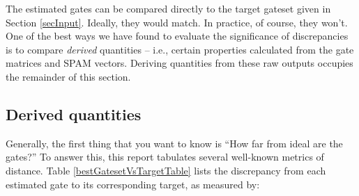 \documentclass{article}[11pt]
\begin{document}
The estimated gates can be compared directly to the target gateset given in Section \ref{secInput}.  Ideally, they would match.  In practice, of course, they won't.  One of the best ways we have found to evaluate the significance of discrepancies is to compare \emph{derived} quantities -- i.e., certain properties calculated from the gate matrices and SPAM vectors.  Deriving quantities from these raw outputs occupies the remainder of this section.

\subsection{Derived quantities\label{derivedQtySection}}

Generally, the first thing that you want to know is ``How far from ideal are the gates?''  To answer this, this report tabulates several well-known metrics of distance.  Table \ref{bestGatesetVsTargetTable} lists the discrepancy from each estimated gate to its corresponding target, as measured by:
\end{document}
